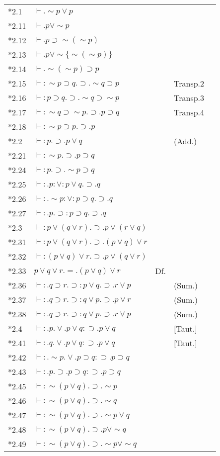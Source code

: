 \noindent\begin{tabular}[t]{l@{\quad}l@{\quad}l@{\quad}ll}
{*2.1} & $\vdash.\sim{p}\vee{p}$\\
{*2.11} & $\vdash.p\vee\sim{p}$\\
{*2.12} & $\vdash.p\supset\sim(\sim{p})$\\
{*2.13} & $\vdash.p\vee\sim\{\sim(\sim{p})\}$\\
{*2.14} & $\vdash.\sim(\sim{p})\supset{p}$\\
{*2.15} & $\vdash:\sim{p}\supset{q}.\supset.\sim{q}\supset{p}$ && Transp.2\\
{*2.16} & $\vdash:p\supset{q}.\supset.\sim{q}\supset\sim{p}$ && Transp.3\\
{*2.17} & $\vdash:\sim{q}\supset\sim{p}.\supset.p\supset{q}$ && Transp.4\\
{*2.18} & $\vdash:\sim{p}\supset{p}.\supset.p$\\
{*2.2} & $\vdash:p.\supset.p\vee{q}$ && (Add.)\\
{*2.21} & $\vdash:\sim{p}.\supset.p\supset{q}$\\
{*2.24} & $\vdash:p.\supset.\sim{p}\supset{q}$\\
{*2.25} & $\vdash:.p:\vee:p\vee{q}.\supset.q$\\
{*2.26} & $\vdash:.\sim{p}:\vee:p\supset{q}.\supset.q$\\
{*2.27} & $\vdash:.p.\supset:p\supset{q}.\supset.q$\\
{*2.3} & $\vdash:p\vee(q\vee{r}).\supset.p\vee(r\vee{q})$\\
{*2.31} & $\vdash:p\vee(q\vee{r}).\supset.(p\vee{q})\vee{r}$\\
{*2.32} & $\vdash:(p\vee{q})\vee{r}.\supset.p\vee(q\vee{r})$\\
{*2.33} & $p\vee{q\vee{r}}.=.(p\vee{q})\vee{r}$ & Df.\\
{*2.36} & $\vdash:.q\supset{r}.\supset:p\vee{q}.\supset.r\vee{p}$ && (Sum.)\\
{*2.37} & $\vdash:.q\supset{r}.\supset:q\vee{p}.\supset.p\vee{r}$ && (Sum.)\\
{*2.38} & $\vdash:.q\supset{r}.\supset:q\vee{p}.\supset.r\vee{p}$ && (Sum.)\\
{*2.4} & $\vdash:.p.\vee.p\vee{q}:\supset.p\vee{q}$ && [Taut.]\\
{*2.41} & $\vdash:.q.\vee.p\vee{q}:\supset.p\vee{q}$ && [Taut.]\\
{*2.42} & $\vdash:.\sim{p}.\vee.p\supset{q}:\supset.p\supset{q}$\\
{*2.43} & $\vdash:.p.\supset.p\supset{q}:\supset.p\supset{q}$\\
{*2.45} & $\vdash:\sim(p\vee{q}).\supset.\sim{p}$\\
{*2.46} & $\vdash:\sim(p\vee{q}).\supset.\sim{q}$\\
{*2.47} & $\vdash:\sim(p\vee{q}).\supset.\sim{p}\vee{q}$\\
{*2.48} & $\vdash:\sim(p\vee{q}).\supset.p\vee\sim{q}$\\
{*2.49} & $\vdash:\sim(p\vee{q}).\supset.\sim{p}\vee\sim{q}$\\
\end{tabular}